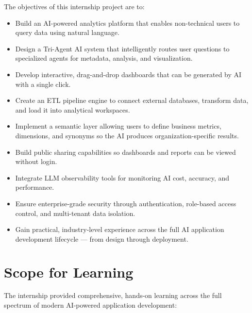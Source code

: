 \documentclass[12pt,a4paper]{report}
\begin{document}
The objectives of this internship project are to:
\begin{itemize}[leftmargin=1.5cm]
    \item Build an AI-powered analytics platform that enables non-technical users to query data using natural language.
    \item Design a Tri-Agent AI system that intelligently routes user questions to specialized agents for metadata, analysis, and visualization.
    \item Develop interactive, drag-and-drop dashboards that can be generated by AI with a single click.
    \item Create an ETL pipeline engine to connect external databases, transform data, and load it into analytical workspaces.
    \item Implement a semantic layer allowing users to define business metrics, dimensions, and synonyms so the AI produces organization-specific results.
    \item Build public sharing capabilities so dashboards and reports can be viewed without login.
    \item Integrate LLM observability tools for monitoring AI cost, accuracy, and performance.
    \item Ensure enterprise-grade security through authentication, role-based access control, and multi-tenant data isolation.
    \item Gain practical, industry-level experience across the full AI application development lifecycle --- from design through deployment.
\end{itemize}

\section{Scope for Learning}

The internship provided comprehensive, hands-on learning across the full spectrum of modern AI-powered application development:
\end{document}
